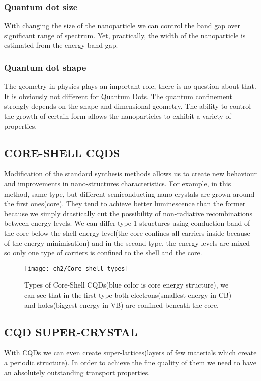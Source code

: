 \subsubsection{Quantum dot size}
With changing the size of the nanoparticle we can control the band gap over significant range of spectrum. Yet, practically, the width of the nanoparticle is estimated from the energy band gap.
 \cite{Yu2003}
 
\subsubsection{Quantum dot shape}
The geometry in physics plays an important role, there is no question about that. It is obviously not different for Quantum Dots. The quantum confinement strongly depends on the shape and dimensional geometry. The ability to control the growth of certain form allows the nanoparticles to exhibit a variety of properties. 

\subsection{CORE-SHELL CQDS}     
Modification of the standard synthesis methods allows us to create new behaviour and improvements in nano-structures characteristics. For example, in this method, same type, but different semiconducting nano-crystals are grown around the first ones(core). They tend to achieve better luminescence than the former because we simply drastically cut the possibility of non-radiative recombinations between energy levels. We can differ type 1 structures using conduction band of the core below the shell energy level(the core confines all carriers inside because of the energy minimisation) and in the second type, the energy levels are mixed so only one type of carriers is confined to the shell and the core. \cite{phdsemi}

\begin{figure}[ht]
\centering
\texttt{[image: ch2/Core\_shell\_types]}
\caption{Types of Core-Shell CQDs(blue color is core energy structure), we can see that in the first type both electrons(smallest energy in CB) and holes(biggest energy in VB) are confined beneath the core. \cite{coreshell}}
\end{figure}

\subsection{CQD SUPER-CRYSTAL}
With CQDs we can even create super-lattices(layers of few materials which create a periodic structure). In order to achieve the fine quality of them we need to have an absolutely outstanding transport properties. \cite{tranSupLat}

